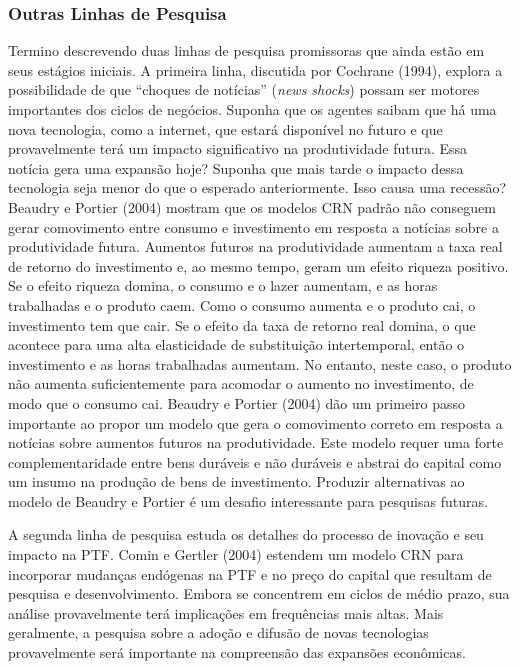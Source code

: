 \documentclass[12pt]{article}
\begin{document}
\subsubsection*{Outras Linhas de Pesquisa}

Termino descrevendo duas linhas de pesquisa promissoras que ainda estão em seus estágios iniciais. A primeira linha, discutida por Cochrane (1994), explora a possibilidade de que “choques de notícias” (\textit{news shocks}) possam ser motores importantes dos ciclos de negócios. Suponha que os agentes saibam que há uma nova tecnologia, como a internet, que estará disponível no futuro e que provavelmente terá um impacto significativo na produtividade futura. Essa notícia gera uma expansão hoje? Suponha que mais tarde o impacto dessa tecnologia seja menor do que o esperado anteriormente. Isso causa uma recessão? Beaudry e Portier (2004) mostram que os modelos CRN padrão não conseguem gerar comovimento entre consumo e investimento em resposta a notícias sobre a produtividade futura. Aumentos futuros na produtividade aumentam a taxa real de retorno do investimento e, ao mesmo tempo, geram um efeito riqueza positivo. Se o efeito riqueza domina, o consumo e o lazer aumentam, e as horas trabalhadas e o produto caem. Como o consumo aumenta e o produto cai, o investimento tem que cair. Se o efeito da taxa de retorno real domina, o que acontece para uma alta elasticidade de substituição intertemporal, então o investimento e as horas trabalhadas aumentam. No entanto, neste caso, o produto não aumenta suficientemente para acomodar o aumento no investimento, de modo que o consumo cai. Beaudry e Portier (2004) dão um primeiro passo importante ao propor um modelo que gera o comovimento correto em resposta a notícias sobre aumentos futuros na produtividade. Este modelo requer uma forte complementaridade entre bens duráveis e não duráveis e abstrai do capital como um insumo na produção de bens de investimento. Produzir alternativas ao modelo de Beaudry e Portier é um desafio interessante para pesquisas futuras.

A segunda linha de pesquisa estuda os detalhes do processo de inovação e seu impacto na PTF. Comin e Gertler (2004) estendem um modelo CRN para incorporar mudanças endógenas na PTF e no preço do capital que resultam de pesquisa e desenvolvimento. Embora se concentrem em ciclos de médio prazo, sua análise provavelmente terá implicações em frequências mais altas. Mais geralmente, a pesquisa sobre a adoção e difusão de novas tecnologias provavelmente será importante na compreensão das expansões econômicas.
\end{document}
